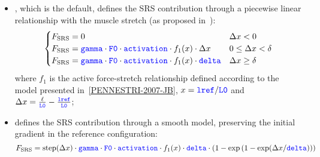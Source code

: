 \begin{itemize}
  \item {}, which is the default, defines the SRS contribution through a
    piecewise linear relationship with the muscle stretch 
    (as proposed in~\cite{DEGROOTE-2017-SRS}):
    \begin{equation}
      \begin{cases}
        F_{\text{SRS}} = 0 &\Delta x < 0 \\
        F_{\text{SRS}} = 
          \textcolor{blue}{\texttt{gamma}}
          \cdot 
          \textcolor{blue}{\texttt{F0}} 
          \cdot 
          \textcolor{blue}{\texttt{activation}} 
          \cdot 
          f_1(x)
          \cdot
          \Delta x
          & 0 \leq \Delta x < \delta
        \\
        F_{\text{SRS}} = 
          \textcolor{blue}{\texttt{gamma}}
          \cdot 
          \textcolor{blue}{\texttt{F0}} 
          \cdot 
          \textcolor{blue}{\texttt{activation}} 
          \cdot 
          f_1(x)
          \cdot
          \textcolor{blue}{\texttt{delta}}
          & \Delta x \ge \delta
      \end{cases}
    \end{equation}
    where $f_1$ is the active force-stretch relationship defined according to the model
    presented in~\ref{PENNESTRI-2007-JB}, $x = \textcolor{blue}{\texttt{lref}}/\textcolor{blue}{\texttt{L0}}$ and 
    $\Delta x = \frac{\ell}{\textcolor{blue}{\texttt{L0}}} - \frac{\textcolor{blue}{\texttt{lref}}}{\textcolor{blue}{\texttt{L0}}}$;
  \item {} defines the SRS contribution through a smooth model, preserving
    the initial gradient in the reference configuration:
    \begin{equation}
      F_{\text{SRS}} = 
      \text{step}(\Delta x) 
      \cdot
      \textcolor{blue}{\texttt{gamma}} 
      \cdot
      \textcolor{blue}{\texttt{F0}}
      \cdot
      \textcolor{blue}{\texttt{activation}} 
      \cdot
      f_1(x)
      \cdot
      \textcolor{blue}{\texttt{delta}}
      \cdot
      \left(
        1 - \text{exp}
        \left(
          1 - \text{exp}(\Delta x/\textcolor{blue}{\texttt{delta}})
        \right)
      \right)
    \end{equation}
\end{itemize}


